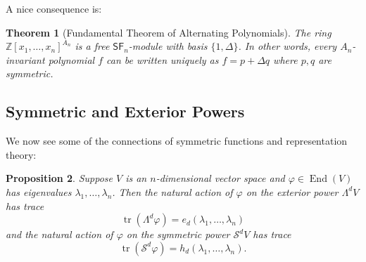 \documentclass[12pt]{article}
\theoremstyle{plain}
\newtheorem{theorem}{Theorem}[section]
\newtheorem{proposition}[theorem]{Proposition}
\theoremstyle{definition}
\theoremstyle{remark}
\numberwithin{equation}{section}
\begin{document}
A nice consequence is:

\begin{theorem}[Fundamental Theorem of Alternating Polynomials]
The ring $\mathbb{Z}[x_1,\ldots,x_n]^{A_n}$ is a free
$\mathsf{SF}_n$-module with basis $\{1, \Delta\}$.
In other words, every $A_n$-invariant polynomial $f$ can be written uniquely
as $f=p+\Delta q$ where $p,q$ are symmetric.
\end{theorem}

\subsection{Symmetric and Exterior Powers}

We now see some of the connections of symmetric functions and
representation theory:

\begin{proposition}
Suppose $V$ is an $n$-dimensional vector space and
$\varphi \in \operatorname{End}(V)$ has eigenvalues
$\lambda_1,\ldots,\lambda_n$.
Then the natural action of $\varphi$ on the exterior power $\Lambda^d V$
has trace
\[
\operatorname{tr}\left( \Lambda^d \varphi \right)
= e_d(\lambda_1,\ldots,\lambda_n)
\]
and the natural action of $\varphi$ on the symmetric power
$\mathcal{S}^d V$ has trace
\[
\operatorname{tr}\left( \mathcal{S}^d \varphi \right)
= h_d(\lambda_1,\ldots,\lambda_n).
\]
\end{proposition}
\end{document}
